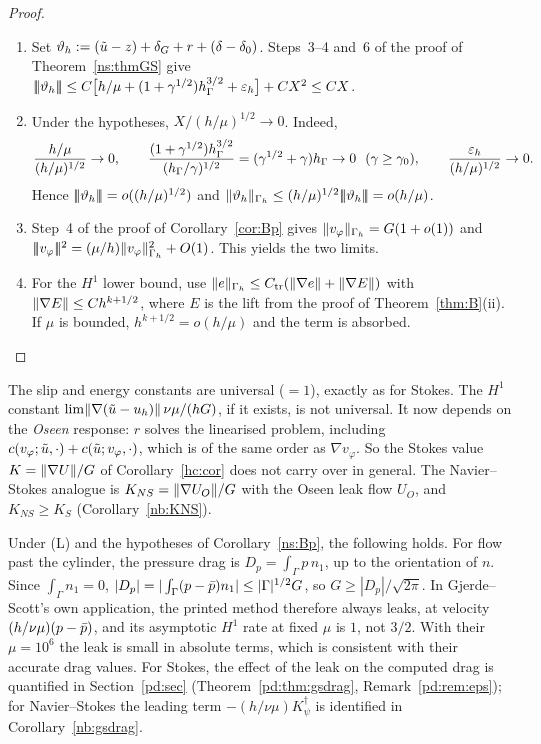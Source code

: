 \begin{proof}
\begin{enumerate}
\item Set $\vartheta_h:=(\tilde u-z)+\delta_G+r+(\delta-\delta_0)$. Steps~3--4 and~6 of the proof of Theorem~\ref{ns:thmGS} give $|\!|\!|\vartheta_h|\!|\!|\le C\bigl[h/\mu+(1+\gamma^{1/2})h_\Gamma^{3/2}+\varepsilon_h\bigr]+CX^2\le CX$.
\item Under the hypotheses, $X/(h/\mu)^{1/2}\to0$. Indeed,
\[
\frac{h/\mu}{(h/\mu)^{1/2}}\to0,\qquad \frac{(1+\gamma^{1/2})\hG^{3/2}}{(\hG/\gamma)^{1/2}}=(\gamma^{1/2}+\gamma)\hG\to0\ \ (\gamma\ge\gamma_0),\qquad \frac{\eps}{(h/\mu)^{1/2}}\to0 .
\]
Hence $|\!|\!|\vartheta_h|\!|\!|=o((h/\mu)^{1/2})$ and $\lVert \vartheta_h\rVert_{\Gamma_h}\le(h/\mu)^{1/2}|\!|\!|\vartheta_h|\!|\!|=o(h/\mu)$.
\item Step~4 of the proof of Corollary~\ref{cor:Bp} gives $\lVert v_\varphi\rVert_{\Gamma_h}=G(1+o(1))$ and $|\!|\!|v_\varphi|\!|\!|^2=(\mu/h)\lVert v_\varphi\rVert^2_{\Gamma_h}+O(1)$. This yields the two limits.
\item For the $H^1$ lower bound, use $\lVert e\rVert_{\Gamma_h}\le C_{\mathrm{tr}}(\lVert \nabla e\rVert+\lVert \nabla E\rVert)$ with $\lVert \nabla E\rVert\le Ch^{k+1/2}$, where $E$ is the lift from the proof of Theorem~\ref{thm:B}(ii). If $\mu$ is bounded, $h^{k+1/2}=o(h/\mu)$ and the term is absorbed.\qedhere
\end{enumerate}
\end{proof}

\begin{remark}\label{ns:H1const}
The slip and energy constants are universal ($=1$), exactly as for Stokes. The $H^1$ constant $\lim\lVert \nabla(\tilde u-u_h)\rVert\,\nu\mu/(hG)$, if it exists, is not universal. It now depends on the \emph{Oseen} response: $r$ solves the linearised problem, including $c(v_\varphi;\tilde u,\cdot)+c(\tilde u;v_\varphi,\cdot)$, which is of the same order as $\nabla v_\varphi$. So the Stokes value $K=\lVert \nabla U\rVert/G$ of Corollary~\ref{hc:cor} does not carry over in general. The Navier--Stokes analogue is $K_{NS}=\lVert \nabla U_O\rVert/G$ with the Oseen leak flow $U_O$, and $K_{NS}\ge K_S$ (Corollary~\ref{nb:KNS}).
\end{remark}

\begin{remark}\label{ns:drag}
Under (L) and the hypotheses of Corollary~\ref{ns:Bp}, the following holds. For flow past the cylinder, the pressure drag is $D_p=\int_\Gamma p\,n_1$, up to the orientation of $n$. Since $\int_\Gamma n_1=0$, $|D_p|=|\int_\Gamma(p-\bar p)n_1|\le|\Gamma|^{1/2}G$, so $G\ge|D_p|/\sqrt{2\pi}$. In Gjerde--Scott's own application, the printed method therefore always leaks, at velocity $(h/\nu\mu)(p-\bar p)$, and its asymptotic $H^1$ rate at fixed $\mu$ is $1$, not $3/2$. With their $\mu=10^6$ the leak is small in absolute terms, which is consistent with their accurate drag values. For Stokes, the effect of the leak on the computed drag is quantified in Section~\ref{pd:sec} (Theorem~\ref{pd:thm:gsdrag}, Remark~\ref{pd:rem:eps}); for Navier--Stokes the leading term $-(h/\nu\mu)K^\dagger_\psi$ is identified in Corollary~\ref{nb:gsdrag}.
\end{remark}

